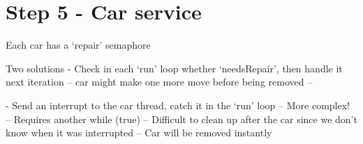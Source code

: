 \section*{Step 5 - Car service}

Each car has a `repair' semaphore

Two solutions
- Check in each `run' loop whether `needsRepair', then handle it next iteration
-- car might make one more move before being removed
--

- Send an interrupt to the car thread, catch it in the `run' loop
-- More complex!
-- Requires another while (true)
-- Difficult to clean up after the car since we don't know when it was interrupted
-- Car will be removed instantly

